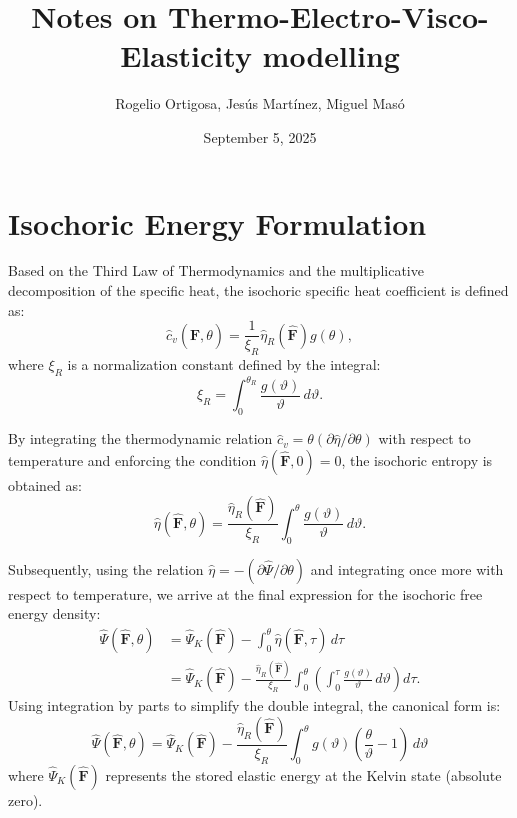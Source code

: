 \documentclass[a4paper,12pt]{article}
\title{Notes on Thermo-Electro-Visco-Elasticity modelling}
\author{Rogelio Ortigosa, Jesús Martínez, Miguel Masó}
\date{September 5, 2025}
\newcommand{\F}{\mathbf{F}}
\newcommand{\0}{\mathbf{0}}
\begin{document}
\section*{Isochoric Energy Formulation}

Based on the Third Law of Thermodynamics and the multiplicative decomposition of the specific heat, the isochoric specific heat coefficient is defined as:
\begin{equation}
    \hat{c}_v(\hat{\F}, \theta) = \frac{1}{\xi_R} \hat{\eta}_R(\hat{\F}) g(\theta),
\end{equation}
where $\xi_R$ is a normalization constant defined by the integral:
\begin{equation}
    \xi_R = \int_0^{\theta_R} \frac{g(\vartheta)}{\vartheta} \, d\vartheta.
\end{equation}

By integrating the thermodynamic relation $\hat{c}_v = \theta (\partial \hat{\eta} / \partial \theta)$ with respect to temperature and enforcing the condition $\hat{\eta}(\hat{\F}, 0) = 0$, the isochoric entropy is obtained as:
\begin{equation}
    \hat{\eta}(\hat{\F}, \theta) = \frac{\hat{\eta}_R(\hat{\F})}{\xi_R} \int_0^\theta \frac{g(\vartheta)}{\vartheta} \, d\vartheta.
\end{equation}

Subsequently, using the relation $\hat{\eta} = -(\partial \hat{\Psi} / \partial \theta)$ and integrating once more with respect to temperature, we arrive at the final expression for the isochoric free energy density:
\begin{align}
    \hat{\Psi}(\hat{\F}, \theta) &= \hat{\Psi}_K(\hat{\F}) - \int_0^\theta \hat{\eta}(\hat{\F}, \tau) \, d\tau \nonumber \\
    &= \hat{\Psi}_K(\hat{\F}) - \frac{\hat{\eta}_R(\hat{\F})}{\xi_R} \int_0^\theta \left( \int_0^\tau \frac{g(\vartheta)}{\vartheta} \, d\vartheta \right) d\tau.
\end{align}
Using integration by parts to simplify the double integral, the canonical form is:
\begin{equation} \label{eq:thermo-mech-Kelvin}
    \boxed{
    \hat{\Psi}(\hat{\F}, \theta) = \hat{\Psi}_K(\hat{\F}) - \frac{\hat{\eta}_R(\hat{\F})}{\xi_R} \int_0^\theta g(\vartheta) \left( \frac{\theta}{\vartheta} - 1 \right) \, d\vartheta
    }
\end{equation}
where $\hat{\Psi}_K(\hat{\F})$ represents the stored elastic energy at the Kelvin state (absolute zero).
\end{document}
